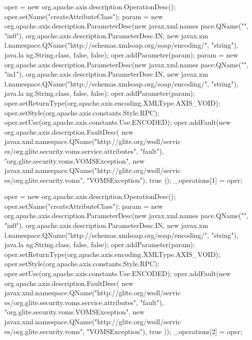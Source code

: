 \begin{DoxyCode}
{        oper = new org.apache.axis.description.OperationDesc();
        oper.setName("createAttributeClass");
        param = new org.apache.axis.description.ParameterDesc(new javax.xml.names
      pace.QName("", "in0"), org.apache.axis.description.ParameterDesc.IN, new javax.xm
      l.namespace.QName("http://schemas.xmlsoap.org/soap/encoding/", "string"), java.la
      ng.String.class, false, false);
        oper.addParameter(param);
        param = new org.apache.axis.description.ParameterDesc(new javax.xml.names
      pace.QName("", "in1"), org.apache.axis.description.ParameterDesc.IN, new javax.xm
      l.namespace.QName("http://schemas.xmlsoap.org/soap/encoding/", "string"), java.la
      ng.String.class, false, false);
        oper.addParameter(param);
        oper.setReturnType(org.apache.axis.encoding.XMLType.AXIS_VOID);
        oper.setStyle(org.apache.axis.constants.Style.RPC);
        oper.setUse(org.apache.axis.constants.Use.ENCODED);
        oper.addFault(new org.apache.axis.description.FaultDesc(
                      new javax.xml.namespace.QName("http://glite.org/wsdl/servic
      es/org.glite.security.voms.service.attributes", "fault"),
                      "org.glite.security.voms.VOMSException",
                      new javax.xml.namespace.QName("http://glite.org/wsdl/servic
      es/org.glite.security.voms", "VOMSException"), 
                      true
                     ));
        _operations[1] = oper;

        oper = new org.apache.axis.description.OperationDesc();
        oper.setName("createAttributeClass");
        param = new org.apache.axis.description.ParameterDesc(new javax.xml.names
      pace.QName("", "in0"), org.apache.axis.description.ParameterDesc.IN, new javax.xm
      l.namespace.QName("http://schemas.xmlsoap.org/soap/encoding/", "string"), java.la
      ng.String.class, false, false);
        oper.addParameter(param);
        oper.setReturnType(org.apache.axis.encoding.XMLType.AXIS_VOID);
        oper.setStyle(org.apache.axis.constants.Style.RPC);
        oper.setUse(org.apache.axis.constants.Use.ENCODED);
        oper.addFault(new org.apache.axis.description.FaultDesc(
                      new javax.xml.namespace.QName("http://glite.org/wsdl/servic
      es/org.glite.security.voms.service.attributes", "fault"),
                      "org.glite.security.voms.VOMSException",
                      new javax.xml.namespace.QName("http://glite.org/wsdl/servic
      es/org.glite.security.voms", "VOMSException"), 
                      true
                     ));
        _operations[2] = oper;

}
\end{DoxyCode}
